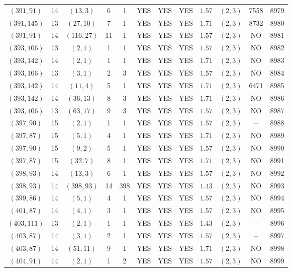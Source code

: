 \begin{longtable}{|c|c|c|c|c|c|c|c|c|c|c|c|}
$(391,91)$ & 14 & $(13,3)$ & 6 & 1 & YES & YES & YES & $1.57$ & $(2,3)$ & 7558 & 8979\\
$(391,145)$ & 13 & $(27,10)$ & 7 & 1 & YES & YES & YES & $1.71$ & $(2,3)$ & 8732 & 8980\\
$(391,91)$ & 14 & $(116,27)$ & 11 & 1 & YES & YES & YES & $1.57$ & $(2,3)$ & NO & 8981\\
$(393,106)$ & 13 & $(2,1)$ & 1 & 1 & YES & YES & YES & $1.57$ & $(2,3)$ & NO & 8982\\
$(393,142)$ & 14 & $(2,1)$ & 1 & 1 & YES & YES & YES & $1.71$ & $(2,3)$ & NO & 8983\\
$(393,106)$ & 13 & $(3,1)$ & 2 & 3 & YES & YES & YES & $1.57$ & $(2,3)$ & NO & 8984\\
$(393,142)$ & 14 & $(11,4)$ & 5 & 1 & YES & YES & YES & $1.71$ & $(2,3)$ & 6471 & 8985\\
$(393,142)$ & 14 & $(36,13)$ & 8 & 3 & YES & YES & YES & $1.71$ & $(2,3)$ & NO & 8986\\
$(393,106)$ & 13 & $(63,17)$ & 9 & 3 & YES & YES & YES & $1.57$ & $(2,3)$ & NO & 8987\\
$(397,90)$ & 15 & $(2,1)$ & 1 & 1 & YES & YES & YES & $1.57$ & $(2,3)$ & -- & 8988\\
$(397,87)$ & 15 & $(5,1)$ & 4 & 1 & YES & YES & YES & $1.71$ & $(2,3)$ & NO & 8989\\
$(397,90)$ & 15 & $(9,2)$ & 5 & 1 & YES & YES & YES & $1.57$ & $(2,3)$ & NO & 8990\\
$(397,87)$ & 15 & $(32,7)$ & 8 & 1 & YES & YES & YES & $1.71$ & $(2,3)$ & NO & 8991\\
$(398,93)$ & 14 & $(13,3)$ & 6 & 1 & YES & YES & YES & $1.57$ & $(2,3)$ & NO & 8992\\
$(398,93)$ & 14 & $(398,93)$ & 14 & 398 & YES & YES & YES & $1.43$ & $(2,3)$ & NO & 8993\\
$(399,86)$ & 14 & $(5,1)$ & 4 & 1 & YES & YES & YES & $1.57$ & $(2,3)$ & NO & 8994\\
$(401,87)$ & 14 & $(4,1)$ & 3 & 1 & YES & YES & YES & $1.57$ & $(2,3)$ & NO & 8995\\
$(403,111)$ & 13 & $(2,1)$ & 1 & 1 & YES & YES & YES & $1.43$ & $(2,3)$ & -- & 8996\\
$(403,87)$ & 14 & $(3,1)$ & 2 & 1 & YES & YES & YES & $1.57$ & $(2,3)$ & -- & 8997\\
$(403,87)$ & 14 & $(51,11)$ & 9 & 1 & YES & YES & YES & $1.71$ & $(2,3)$ & NO & 8998\\
$(404,91)$ & 14 & $(2,1)$ & 1 & 2 & YES & YES & YES & $1.57$ & $(2,3)$ & NO & 8999\\

\end{longtable}

